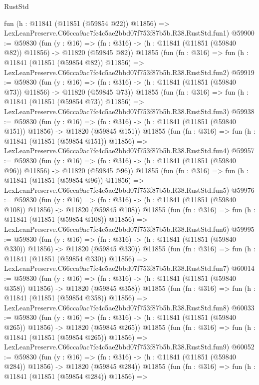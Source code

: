\begin{lexlean}{RustStd}
\begin{coremodule}
    fun (h : @11841 (@11851 (@59854 @22)) @11856) =>
    LexLeanPreserve.C66cca9ac7fc4c5ae2bbd07f753f87b5b.R38.RustStd.fun1)
@59900 := @59830
    (fun (y : @16) =>
    (fn : @316) -> (h : @11841 (@11851 (@59840 @82)) @11856) -> @11820 (@59845 @82))
    @11855
    (fun (fn : @316) =>
    fun (h : @11841 (@11851 (@59854 @82)) @11856) =>
    LexLeanPreserve.C66cca9ac7fc4c5ae2bbd07f753f87b5b.R38.RustStd.fun2)
@59919 := @59830
    (fun (y : @16) =>
    (fn : @316) -> (h : @11841 (@11851 (@59840 @73)) @11856) -> @11820 (@59845 @73))
    @11855
    (fun (fn : @316) =>
    fun (h : @11841 (@11851 (@59854 @73)) @11856) =>
    LexLeanPreserve.C66cca9ac7fc4c5ae2bbd07f753f87b5b.R38.RustStd.fun3)
@59938 := @59830
    (fun (y : @16) =>
    (fn : @316) -> (h : @11841 (@11851 (@59840 @151)) @11856) -> @11820 (@59845 @151))
    @11855
    (fun (fn : @316) =>
    fun (h : @11841 (@11851 (@59854 @151)) @11856) =>
    LexLeanPreserve.C66cca9ac7fc4c5ae2bbd07f753f87b5b.R38.RustStd.fun4)
@59957 := @59830
    (fun (y : @16) =>
    (fn : @316) -> (h : @11841 (@11851 (@59840 @96)) @11856) -> @11820 (@59845 @96))
    @11855
    (fun (fn : @316) =>
    fun (h : @11841 (@11851 (@59854 @96)) @11856) =>
    LexLeanPreserve.C66cca9ac7fc4c5ae2bbd07f753f87b5b.R38.RustStd.fun5)
@59976 := @59830
    (fun (y : @16) =>
    (fn : @316) -> (h : @11841 (@11851 (@59840 @108)) @11856) -> @11820 (@59845 @108))
    @11855
    (fun (fn : @316) =>
    fun (h : @11841 (@11851 (@59854 @108)) @11856) =>
    LexLeanPreserve.C66cca9ac7fc4c5ae2bbd07f753f87b5b.R38.RustStd.fun6)
@59995 := @59830
    (fun (y : @16) =>
    (fn : @316) -> (h : @11841 (@11851 (@59840 @330)) @11856) -> @11820 (@59845 @330))
    @11855
    (fun (fn : @316) =>
    fun (h : @11841 (@11851 (@59854 @330)) @11856) =>
    LexLeanPreserve.C66cca9ac7fc4c5ae2bbd07f753f87b5b.R38.RustStd.fun7)
@60014 := @59830
    (fun (y : @16) =>
    (fn : @316) -> (h : @11841 (@11851 (@59840 @358)) @11856) -> @11820 (@59845 @358))
    @11855
    (fun (fn : @316) =>
    fun (h : @11841 (@11851 (@59854 @358)) @11856) =>
    LexLeanPreserve.C66cca9ac7fc4c5ae2bbd07f753f87b5b.R38.RustStd.fun8)
@60033 := @59830
    (fun (y : @16) =>
    (fn : @316) -> (h : @11841 (@11851 (@59840 @265)) @11856) -> @11820 (@59845 @265))
    @11855
    (fun (fn : @316) =>
    fun (h : @11841 (@11851 (@59854 @265)) @11856) =>
    LexLeanPreserve.C66cca9ac7fc4c5ae2bbd07f753f87b5b.R38.RustStd.fun9)
@60052 := @59830
    (fun (y : @16) =>
    (fn : @316) -> (h : @11841 (@11851 (@59840 @284)) @11856) -> @11820 (@59845 @284))
    @11855
    (fun (fn : @316) =>
    fun (h : @11841 (@11851 (@59854 @284)) @11856) =>

\end{coremodule}
\end{lexlean}
